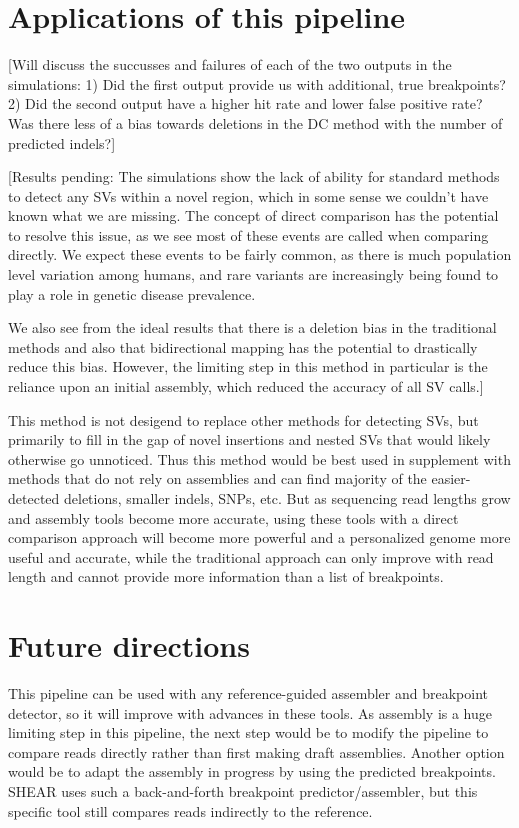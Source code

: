 \documentclass{easychithesis}
\begin{document}
\section{Applications of this pipeline}
[Will discuss the succusses and failures of each of the two outputs in the simulations:
	1) Did the first output provide us with additional, true breakpoints?\\
	2) Did the second output have a higher hit rate and lower false positive rate?\\
Was there less of a bias towards deletions in the DC method with the number of predicted indels?]

[Results pending: The simulations show the lack of ability for standard methods to detect any SVs within a novel region, which in some sense we couldn't have known what we are missing. The concept of direct comparison has the potential to resolve this issue, as we see most of these events are called when comparing directly. We expect these events to be fairly common, as there is much population level variation among humans, and rare variants are increasingly being found to play a role in genetic disease prevalence.

We also see from the ideal results that there is a deletion bias in the traditional methods and also that bidirectional mapping has the potential to drastically reduce this bias. However, the limiting step in this method in particular is the reliance upon an initial assembly, which reduced the accuracy of all SV calls.]

This method is not desigend to replace other methods for detecting SVs, but primarily to fill in the gap of novel insertions and nested SVs that would likely otherwise go unnoticed. Thus this method would be best used in supplement with methods that do not rely on assemblies and can find majority of the easier-detected deletions, smaller indels, SNPs, etc. But as sequencing read lengths grow and assembly tools become more accurate, using these tools with a direct comparison approach will become more powerful and a personalized genome more useful and accurate, while the traditional approach can only improve with read length and cannot provide more information than a list of breakpoints.

\section{Future directions}
This pipeline can be used with any reference-guided assembler and breakpoint detector, so it will improve with advances in these tools. As assembly is a huge limiting step in this pipeline, the next step would be to modify the pipeline to compare reads directly rather than first making draft assemblies. Another option would be to adapt the assembly in progress by using the predicted breakpoints. SHEAR \cite{landman2014shear} uses such a back-and-forth breakpoint predictor/assembler, but this specific tool still compares reads indirectly to the reference.
\end{document}
